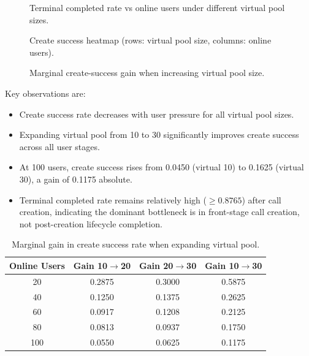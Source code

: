 \documentclass[12pt,a4paper]{report}
\newcommand{\MatrixChartsDir}{../data/matrix-1775300745300/charts}
\begin{document}
\begin{figure}[H]
\centering

\caption{Terminal completed rate vs online users under different virtual pool sizes.}
\label{fig:terminal-completed-line}
\end{figure}

\begin{figure}[H]
\centering

\caption{Create success heatmap (rows: virtual pool size, columns: online users).}
\label{fig:create-heatmap}
\end{figure}

\begin{figure}[H]
\centering

\caption{Marginal create-success gain when increasing virtual pool size.}
\label{fig:marginal-gain}
\end{figure}

Key observations are:
\begin{itemize}
  \item Create success rate decreases with user pressure for all virtual pool sizes.
  \item Expanding virtual pool from 10 to 30 significantly improves create success across all user stages.
  \item At 100 users, create success rises from 0.0450 (virtual 10) to 0.1625 (virtual 30), a gain of 0.1175 absolute.
  \item Terminal completed rate remains relatively high (\(\ge 0.8765\)) after call creation, indicating the dominant bottleneck is in front-stage call creation, not post-creation lifecycle completion.
\end{itemize}

\begin{table}[H]
\centering
\caption{Marginal gain in create success rate when expanding virtual pool.}
\label{tab:marginal-gains}
\begin{tabular}{cccc}
\toprule
Online Users & Gain 10\(\rightarrow\)20 & Gain 20\(\rightarrow\)30 & Gain 10\(\rightarrow\)30 \\
\midrule
20 & 0.2875 & 0.3000 & 0.5875 \\
40 & 0.1250 & 0.1375 & 0.2625 \\
60 & 0.0917 & 0.1208 & 0.2125 \\
80 & 0.0813 & 0.0937 & 0.1750 \\
100 & 0.0550 & 0.0625 & 0.1175 \\
\bottomrule
\end{tabular}
\end{table}
\end{document}
